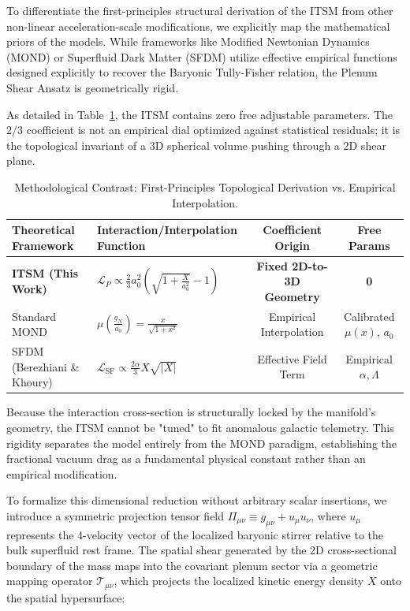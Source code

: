 \documentclass[aps,prd,10pt,twocolumn,superscriptaddress,nofootinbib,floatfix]{revtex4-2}
\begin{document}
To differentiate the first-principles structural derivation of the ITSM from other non-linear acceleration-scale modifications, we explicitly map the mathematical priors of the models. While frameworks like Modified Newtonian Dynamics (MOND) or Superfluid Dark Matter (SFDM) utilize effective empirical functions designed explicitly to recover the Baryonic Tully-Fisher relation, the Plenum Shear Ansatz is geometrically rigid.

As detailed in Table~\ref{tab:mond_matrix}, the ITSM contains zero free adjustable parameters. The $2/3$ coefficient is not an empirical dial optimized against statistical residuals; it is the topological invariant of a 3D spherical volume pushing through a 2D shear plane.

\begin{table}[htbp]
\caption{\label{tab:mond_matrix}Methodological Contrast: First-Principles Topological Derivation vs. Empirical Interpolation.}
\begin{ruledtabular}
\begin{tabular}{llcc}
\textbf{Theoretical Framework} & \textbf{Interaction/Interpolation Function} & \textbf{Coefficient Origin} & \textbf{Free Params} \\
\hline
\textbf{ITSM (This Work)} & $\mathcal{L}_{P} \propto \frac{2}{3} a_0^2 \left(\sqrt{1+\frac{X}{a_0^2}}-1\right)$ & \textbf{Fixed 2D-to-3D Geometry} & \textbf{0} \\
Standard MOND & $\mu\left(\frac{g_N}{a_0}\right) = \frac{x}{\sqrt{1+x^2}}$ & Empirical Interpolation & Calibrated $\mu(x)$, $a_0$ \\
SFDM (Berezhiani \& Khoury) & $\mathcal{L}_{\text{SF}} \propto \frac{2\alpha}{3} X\sqrt{|X|}$ & Effective Field Term & Empirical $\alpha, \Lambda$ \\
\end{tabular}
\end{ruledtabular}
\end{table}

Because the interaction cross-section is structurally locked by the manifold's geometry, the ITSM cannot be "tuned" to fit anomalous galactic telemetry. This rigidity separates the model entirely from the MOND paradigm, establishing the fractional vacuum drag as a fundamental physical constant rather than an empirical modification.

To formalize this dimensional reduction without arbitrary scalar insertions, we introduce a symmetric projection tensor field $\Pi_{\mu\nu} \equiv g_{\mu\nu} + u_{\mu}u_{\nu}$, where $u_{\mu}$ represents the 4-velocity vector of the localized baryonic stirrer relative to the bulk superfluid rest frame. The spatial shear generated by the 2D cross-sectional boundary of the mass maps into the covariant plenum sector via a geometric mapping operator $\mathcal{T}_{\mu\nu}$, which projects the localized kinetic energy density $X$ onto the spatial hypersurface:
\end{document}
